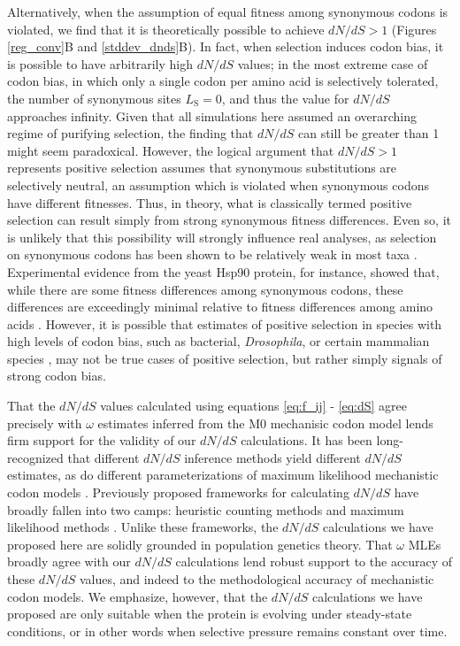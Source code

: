 \documentclass{pnastwo}
\begin{document}
\begin{article}
Alternatively, when the assumption of equal fitness among synonymous codons is violated, we find that it is theoretically possible to achieve $dN/dS > 1$ (Figures \ref{reg_conv}B and \ref{stddev_dnds}B). In fact, when selection induces codon bias, it is possible to have arbitrarily high $dN/dS$ values; in the most extreme case of codon bias, in which only a single codon per amino acid is selectively tolerated, the number of synonymous sites $L_\text{S} = 0$, and thus the value for $dN/dS$ approaches infinity. Given that all simulations here assumed an overarching regime of purifying selection, the finding that $dN/dS$ can still be greater than 1 might seem paradoxical. However, the logical argument that $dN/dS > 1$ represents positive selection assumes that synonymous substitutions are selectively neutral, an assumption which is violated when synonymous codons have different fitnesses. Thus, in theory, what is classically termed positive selection can result simply from strong synonymous fitness differences. Even so, it is unlikely that this possibility will strongly influence real analyses, as selection on synonymous codons has been shown to be relatively weak in most taxa \cite{HershbergPetrov2008}. Experimental evidence from the yeast Hsp90 protein, for instance, showed that, while there are some fitness differences among synonymous codons, these differences are exceedingly minimal relative to fitness differences among amino acids \cite{Hietpas2011,Hietpas2013}. However, it is possible that estimates of positive selection in species with high levels of codon bias, such as bacterial, \textit{Drosophila}, or certain mammalian species \cite{Duret2002, Chamaryetal2006, PlotkinKudla2010}, may not be true cases of positive selection, but rather simply signals of strong codon bias.

That the $dN/dS$ values calculated using equations \eqref{eq:f_ij} - \eqref{eq:dS} agree precisely with $\omega$ estimates inferred from the M0 mechanisic codon model lends firm support for the validity of our $dN/dS$ calculations. It has been long-recognized that different $dN/dS$ inference methods yield different $dN/dS$ estimates, as do different parameterizations of maximum likelihood mechanistic codon models \cite{YN00,Yang2006,ZhangYu2006}. Previously proposed frameworks for calculating $dN/dS$ have broadly fallen into two camps: heuristic counting methods \cite{LWL85,NG86,Pamilo1993,Ina1995,YN00} and maximum likelihood methods \cite{GoldmanYang1994,MuseGaut1994,Yang2006,Anisimova2009}. Unlike these frameworks, the $dN/dS$ calculations we have proposed here are solidly grounded in population genetics theory. That $\omega$ MLEs broadly agree with our $dN/dS$ calculations lend robust support to the accuracy of these $dN/dS$ values, and indeed to the methodological accuracy of mechanistic codon models. We emphasize, however, that the $dN/dS$ calculations we have proposed are only suitable when the protein is evolving under steady-state conditions, or in other words when selective pressure remains constant over time.



\end{article}
\end{document}
